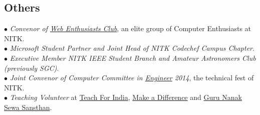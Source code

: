 \documentclass[margin,line]{resume}
\begin{document}
\begin{resume}
    \section{\mysidestyle \bf Others}
 $\bullet$ {\it Convenor of \href{https://webclub-nitk.github.io/}{Web Enthusiasts Club}}, an elite group of Computer Enthusiasts at NITK. \\
 $\bullet$ {\it Microsoft Student Partner and Joint Head of NITK Codechef Campus Chapter}. \\
     $\bullet$ {\it Executive Member NITK IEEE Student Branch and Amateur Astronomers Club (previously SGC)}. \\
     $\bullet$ {\it Joint Convenor of Computer Committee in \href{http://www.nitk.ac.in/students-activities/engineer}{Engineer} 2014}, the technical fest of NITK. \\
$\bullet$ {\it Teaching Volunteer} at \href{http://www.teachforindia.org/}{Teach For India}, \href{http://makeadiff.in/}{Make a Difference} and \href{https://www.nanakg.org/}{Guru Nanak Sewa Sansthan}. \\


\end{resume}
\end{document}
